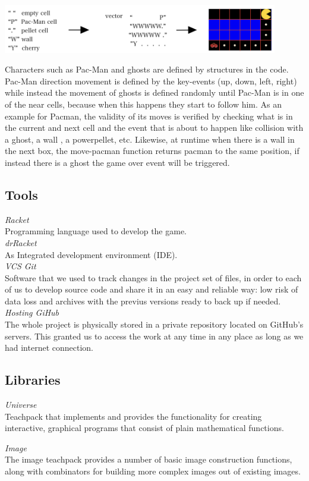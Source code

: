 \documentclass{article}
\begin{document}
 \begin{center}
 \includegraphics[width=12cm]{./images/vector.jpeg}
 \end{center}

 Characters such as Pac-Man and ghosts are defined by structures in the code. Pac-Man direction movement is defined by the key-events (up, down, left, right) while instead the movement of ghosts is defined randomly until Pac-Man is in one of the near cells, because when this happens they start to follow him.
 As an example for Pacman, the validity of its moves is verified by checking what is in the current and next cell and the event that is about to happen like collision with a ghost, a wall , a powerpellet, etc. Likewise, at runtime when there is a wall in the next box, the move-pacman function returns pacman to the same position, if instead there is a ghost the game over event will be triggered.
 
 \subsection{Tools}
 
 \hspace{0.5cm}\textit{Racket}\\
 Programming language used to develop the game.\\
 

 \textit{drRacket}\\
 As Integrated development environment (IDE).\\
 
 \textit{VCS Git}\\
Software that we used to track changes in the project set of files, in order to each of us to develop source code and share it in an easy and reliable way: low risk of data loss and archives with the previus versions ready to back up if needed.\\

 \textit{Hosting GiHub}\\
The whole project is physically stored in a private repository located on GitHub's servers. This granted us to access the work at any time in any place as long as we had internet connection.

\subsection{Libraries}
 \hspace{0.5cm}\textit{Universe}\\
 Teachpack that implements and provides the functionality for creating interactive, graphical programs that consist of plain mathematical functions.
 
 \textit{Image}\\
The image teachpack provides a number of basic image construction functions, along with combinators for building more complex images out of existing images.

\end{document}
